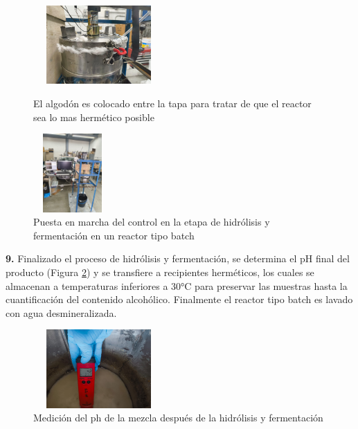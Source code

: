 \documentclass[12pt]{article}
\begin{document}
	 
	     		     \begin{figure}[H]
	     		\centering
	     		\begin{minipage}{0.46\textwidth}
	     			\centering
	     			\includegraphics[width=5cm, height=3cm]{imagenes/hidrolisis 6} %
	     			\caption{ El algodón es colocado entre la tapa para tratar de que el reactor sea lo mas hermético posible }
	     			\label{hidrolisis  6}
	     		\end{minipage}
	     		\hfill
	     		\begin{minipage}{0.48\textwidth}
	     			\centering
	     			\includegraphics[width=3cm, height=3cm]{imagenes/conexion de hidrolisis } %
	     			\caption{ Puesta en marcha del control en la etapa de hidrólisis y fermentación en un reactor tipo batch}
	     			\label{hidrolisis 8}
	     		\end{minipage}
	     	\end{figure}
	     	
	     	
	     	\textbf{9.} Finalizado el proceso de hidrólisis y fermentación, se determina el pH final del producto (Figura \ref{hidrolisis 7}) y se transfiere a recipientes herméticos, los cuales se almacenan a temperaturas inferiores a 30°C para preservar las muestras hasta la cuantificación del contenido alcohólico. Finalmente el reactor tipo batch es lavado con agua desmineralizada.
	     	
	     	
	     		   	\begin{figure}[H]
	     		\centering
	     		\includegraphics[width=5cm, height=3cm]{imagenes/hidrolisis7}
	     		\caption{ Medición del ph de la mezcla después de la hidrólisis y fermentación}
	     		\label{hidrolisis 7}
	     	\end{figure}
	     	
\end{document}
